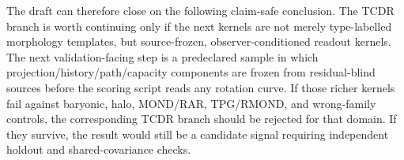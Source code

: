 \documentclass[11pt]{article}
\begin{document}
The draft can therefore close on the following claim-safe conclusion.  The
TCDR branch is worth continuing only if the next kernels are not merely
type-labelled morphology templates, but source-frozen, observer-conditioned
readout kernels.  The next validation-facing step is a predeclared sample in
which projection/history/path/capacity components are frozen from
residual-blind sources before the scoring script reads any rotation curve.  If
those richer kernels fail against baryonic, halo, MOND/RAR, TPG/RMOND, and
wrong-family controls, the corresponding TCDR branch should be rejected for
that domain.  If they survive, the result would still be a candidate signal
requiring independent holdout and shared-covariance checks.




\end{document}
